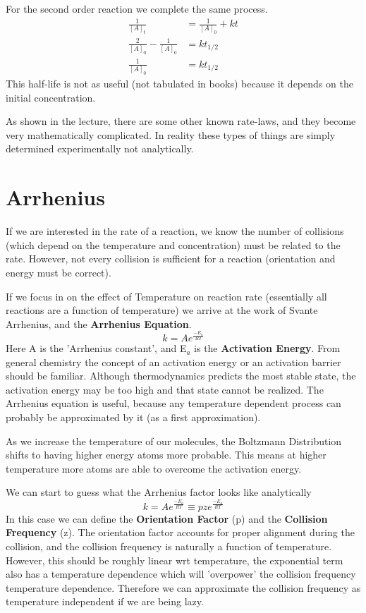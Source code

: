 \documentclass{article}
\newcommand{\be}{\begin{equation}}
\newcommand{\ee}{\end{equation}}
\begin{document}
For the second order reaction we complete the same process. 
\be
\begin{split}
\frac{1}{[A]_t} &= \frac{1}{[A]_0} + kt\\
\frac{2}{[A]_0} - \frac{1}{[A]_0} &=  kt_{1/2}\\
\frac{1}{[A]_0}  &= kt_{1/2}
\end{split}
\ee
This half-life is not  as useful (not tabulated in books) because it depends on the initial concentration.

As shown in the lecture, there are some other known rate-laws, and they become very mathematically complicated. 
In reality these types of things are simply determined experimentally not analytically. 

\section{Arrhenius}
If we are interested in the rate of a reaction, we know the number of collisions (which depend on the temperature and concentration) must be related to the rate.
However, not every collision is sufficient for a reaction (orientation and energy must be correct). 

If we focus in on the effect of Temperature on reaction rate (essentially all reactions are a function of temperature) we arrive at the work of Svante Arrhenius, and the \textbf{Arrhenius Equation}. 
\be
k = Ae^{\frac{-E_a}{RT}}
\ee
Here A is the 'Arrhenius constant',  and E$_a$ is the \textbf{Activation Energy}. 
From general chemistry the concept of an activation energy or an activation barrier should be familiar. 
Although thermodynamics predicts the most stable state, the activation energy may be too high and that state cannot be realized. 
The Arrhenius equation is useful, because any temperature dependent  process  can  probably be approximated by it (as a first approximation). 

As we increase the temperature of our molecules, the Boltzmann Distribution shifts to having higher energy atoms more probable.
This means at higher temperature more atoms are able to overcome the activation energy.

We can start to guess what the Arrhenius factor looks like analytically
\be
k = A e^{\frac{-E_a}{RT}} \equiv pze^{\frac{-E_a}{RT}}
\ee
In this case we can define the \textbf{Orientation Factor} (p) and the \textbf{Collision Frequency} (z).
The orientation factor  accounts for proper alignment during the collision, and the collision frequency is naturally a function of temperature.
However, this  should be roughly linear wrt temperature, the exponential term also has a temperature dependence which will 'overpower' the collision frequency temperature dependence. 
Therefore we can approximate the collision frequency as temperature independent if we are being lazy. 
\end{document}
